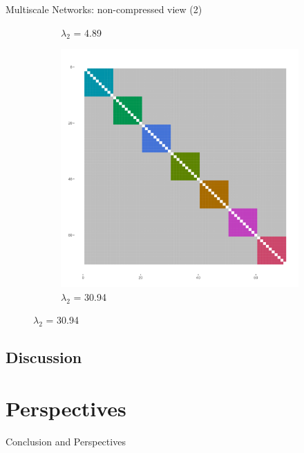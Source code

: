 \documentclass[11pt]{beamer}
\newcommand{\prune}[1]{\textcolor{Framaprunelight}{#1}}
\begin{document}
\begin{frame}{Multiscale Networks: non-compressed view (2)}
\begin{figure}
\begin{subfigure}{0.3\linewidth}
\caption{$\lambda_2$ = 4.89}
\end{subfigure}
\hfill
\begin{subfigure}{0.3\linewidth}
\centering
\includegraphics[scale = 0.14]{images/colored-adj_mat_mglasso_genot20_order_omic.png}
\caption{$\lambda_2$ = 30.94}
\end{subfigure}
\end{figure}
\end{frame}



\subsection{Discussion}


\section{Perspectives}
\begin{frame}{}
\begin{center}
\Huge{\prune{Conclusion and Perspectives}}
\end{center}
\end{frame}
\end{document}
